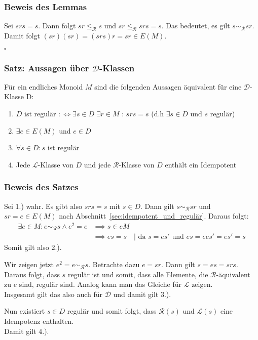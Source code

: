 \documentclass[12pt, german]{article}
\newcommand{\grer}{\sim_{\mathcal{R}}}
\newcommand{\lgrereq}{\leqslant_{\mathcal{R}}}
\newcommand{\lcal}{\mathcal L}
\newcommand{\rcal}{\mathcal R}
\newcommand{\dcal}{\mathcal D}
\newcommand{\bewiesen}{
	
	\begin{flushright}
		$\square$  \\
\end{flushright}}
\begin{document}
	\subsubsection{Beweis des Lemmas}
	Sei $srs=s$. Dann folgt $sr \lgrereq s$ und $sr \lgrereq srs = s$. Das bedeutet, es gilt $s \grer sr$. Damit folgt $(sr)(sr) = (srs)r = sr \in E(M)$.
	\bewiesen
	
	\subsubsection{Satz: Aussagen über $\dcal$-Klassen}
	Für ein endliches Monoid $M$ sind die folgenden Aussagen äquivalent für eine $\dcal$-Klasse D: 
	\begin{enumerate}[label=\arabic*.)]
		\item $D$ ist regulär $:\iff \exists s \in D$  $\exists r \in M$ : $srs = s$ (d.h $\exists s \in D$ und $s$ regulär)
		\item $\exists e \in E(M)$ und $e \in D$
		\item $\forall s \in D: s$ ist regulär
		\item Jede $\lcal$-Klasse von $D$ und jede $\rcal$-Klasse von $D$ enthält ein Idempotent
	\end{enumerate}
	
	\subsubsection{Beweis des Satzes}
	Sei 1.) wahr. Es gibt also $srs = s$ mit $s \in D$. Dann gilt $s \grer sr$ und $sr=e \in E(M)$ nach Abschnitt~\ref{sec:idempotent_und_regulär}. Daraus folgt: 
	\begin{align*}
		 \exists e \in M: e \grer s \wedge e^2 = e 
		&\implies s \in eM \\
		&\implies es = s \quad | \text{ da } s=es' \text{ und } es = ees' = es' = s
	\end{align*}
	Somit gilt also 2.).
	\newline
	
	Wir zeigen jetzt $e^2 = e \grer s$. Betrachte dazu $e=sr$. Dann gilt $ s = es = srs$. Daraus folgt, dass $s$ regulär ist und somit, dass alle Elemente, die $\rcal$-äquivalent zu $e$ sind, regulär sind.
	Analog kann man das Gleiche für $\lcal$ zeigen. \\
	Insgesamt gilt das also auch für $\dcal$ und damit gilt 3.).
	\newline
	
	Nun existiert $s \in D$ regulär und somit folgt, dass $\rcal(s)$ und $\lcal(s)$ eine Idempotenz enthalten. \\
	Damit gilt 4.).
	
\end{document}
